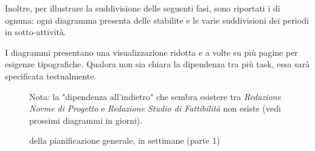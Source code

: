 Inoltre, per illustrare la suddivisione delle seguenti fasi, sono riportati i  di ognuna: ogni diagramma presenta delle  stabilite e le varie suddivisioni dei periodi in sotto-attività.

I diagrammi presentano una visualizzazione ridotta e a volte su più pagine per esigenze tipografiche. Qualora non sia chiara la dipendenza tra più task, essa sarà specificata testualmente.

\begin{figure}[H]
\label{tab:genweeks}
\caption{ della pianificazione generale, in settimane (parte 1)}

Nota: la "dipendenza all'indietro" che sembra esistere tra \emph{Redazione Norme di Progetto} e \emph{Redazione Studio di Fattibilità} non esiste (vedi prossimi diagrammi in giorni).
\end{figure}


